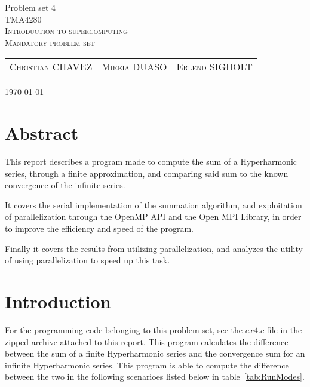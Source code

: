 \documentclass[fontsize=11pt,paper=a4,titlepage]{report}
\begin{document}
\begin{center}


{\huge Problem set 4}\\[0.5cm]

\textsc{\LARGE TMA4280}\\[0.5cm]
\textsc{\large Introduction to supercomputing -}\\
\textsc{\large Mandatory problem set}\\[0.6cm]

\begin{table}[h]
\centering
\begin{tabular}{ccc}
	\textsc{Christian CHAVEZ}	&	\textsc{Mireia DUASO}	&	\textsc{Erlend SIGHOLT}
\end{tabular}
\end{table}

\large{\today}
\vfill
\section*{Abstract}
\end{center}

This report describes a program made to compute the sum of a Hyperharmonic
series, through a finite approximation, and comparing said sum to the known
convergence of the infinite series.

It covers the serial implementation of the summation algorithm, and exploitation
of parallelization through the OpenMP API and the Open MPI Library, in order to
improve the efficiency and speed of the program.

Finally it covers the results from utilizing parallelization, and analyzes the
utility of using parallelization to speed up this task.

\addtocounter{chapter}{1}

\clearpage
\section{Introduction}

For the programming code belonging to this problem set, see the $\textit{ex4.c}$
file in the zipped archive attached to this report. This program calculates the
difference between the sum of a finite Hyperharmonic series and the convergence
sum for an infinite Hyperharmonic series. This program is able to compute the
difference between the two in the following scenarioes listed below in
table~\ref{tab:RunModes}.
\end{document}
